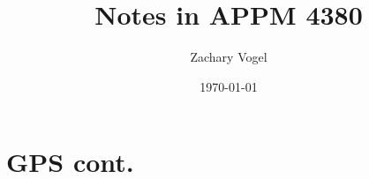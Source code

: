 \documentclass{article}
\author{Zachary Vogel}
\title{Notes in APPM 4380}
\date{\today}
\begin{document}
\maketitle
\section{GPS cont.}
\end{document}
